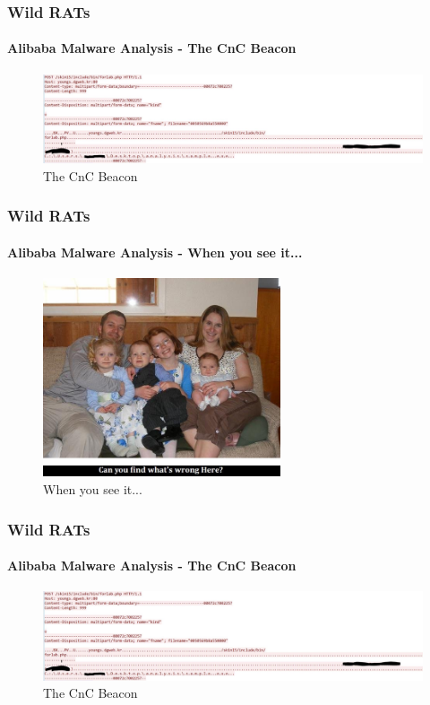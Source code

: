 \documentclass[aspectratio=169]{beamer}
\begin{document}
\begin{frame}
  \frametitle{Wild RATs}
  \framesubtitle{Alibaba Malware Analysis - The CnC Beacon}
  \begin{center}
    \begin{figure}
      \includegraphics[width=14cm,keepaspectratio]{alibaba_http}
      \caption{The CnC Beacon}
    \end{figure}
  \end{center}
\end{frame}

\begin{frame}
  \frametitle{Wild RATs}
  \framesubtitle{Alibaba Malware Analysis - When you see it...}
  \begin{center}
    \begin{figure}
      \includegraphics[width=7cm,keepaspectratio]{whats_wrong_here}
      \caption{When you see it...}
    \end{figure}
  \end{center}
\end{frame}

\begin{frame}
  \frametitle{Wild RATs}
  \framesubtitle{Alibaba Malware Analysis - The CnC Beacon}
  \begin{center}
    \begin{figure}
      \includegraphics[width=14cm,keepaspectratio]{alibaba_http}
      \caption{The CnC Beacon}
    \end{figure}
  \end{center}
\end{frame}
\end{document}
